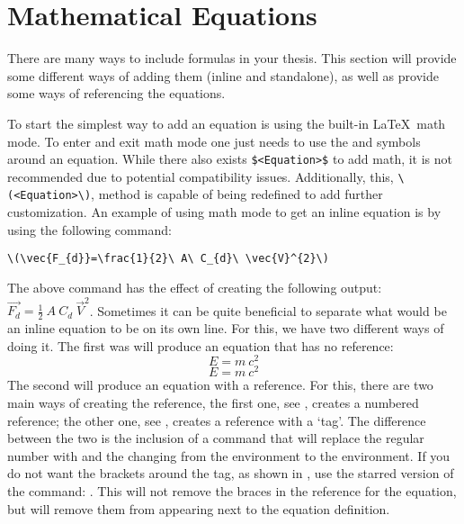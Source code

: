 \chapter{Mathematical Equations}\label{ch:mathematicalequations}
	There are many ways to include formulas in your thesis. 
	This section will provide some different ways of adding them (inline and standalone), as well as provide some ways of referencing the equations.

	To start the simplest way to add an equation is using the built-in \LaTeX\ math mode. 
	To enter and exit math mode one just needs to use the \cmd{(} and \cmd{)} symbols around an equation. While there also exists \lstinline|$<Equation>$| to add math, it is not recommended due to potential compatibility issues. Additionally, this, \lstinline|\(<Equation>\)|, method is capable of being redefined to add further customization. 
	An example of using math mode to get an inline equation is by using the following command:
	\begin{center}
		\lstinline|\(\vec{F_{d}}=\frac{1}{2}\ A\ C_{d}\ \vec{V}^{2}\)|
	\end{center}
	The above command has the effect of creating the following output: \(\vec{F_{d}}=\frac{1}{2}\ A\ C_{d}\ \vec{V}^{2}\).
	Sometimes it can be quite beneficial to separate what would be an inline equation to be on its own line. 
	For this, we have two different ways of doing it. 
	The first was will produce an equation that has no reference:
	\[
		E = m\ c^2
	\] %
	\begin{equation*}
		E = m\ c^2
	\end{equation*}
	The second will produce an equation with a reference. 
	For this, there are two main ways of creating the reference, the first one, see , creates a numbered reference; the other one, see , creates a reference with a `tag'. 
	The difference between the two is the inclusion of a  command that will replace the regular number with  and the changing from the  environment to the  environment.
	If you do not want the brackets around the tag, as shown in , use the starred version of the command: . This will not remove the braces in the reference for the equation, but will remove them from appearing next to the equation definition.


